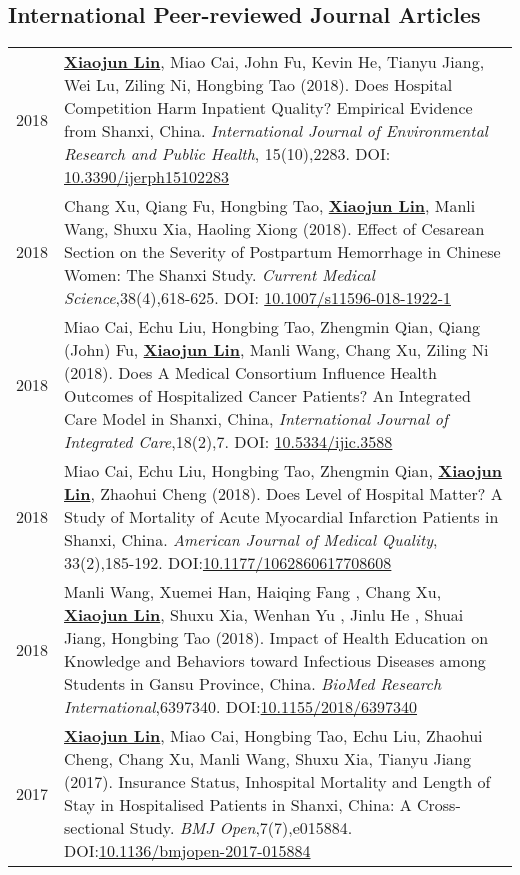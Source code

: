 \documentclass[a4paper,10pt]{article}
\begin{document}
\subsection*{International Peer-reviewed Journal Articles}
\begin{longtable}{r p{13cm}}
2018 & \underline{\textbf{Xiaojun Lin}}, Miao Cai, John Fu, Kevin He, Tianyu Jiang, Wei Lu, Ziling Ni, Hongbing Tao (2018). Does Hospital Competition Harm Inpatient Quality? Empirical Evidence from Shanxi, China. \emph{International Journal of Environmental Research and Public Health}, 15(10),2283. DOI: \href{https://doi.org/10.3390/ijerph15102283}{10.3390/ijerph15102283}\\
2018 & Chang Xu, Qiang Fu, Hongbing Tao, \underline{\textbf{Xiaojun Lin}}, Manli Wang, Shuxu Xia, Haoling Xiong (2018). Effect of Cesarean Section on the Severity of Postpartum Hemorrhage in Chinese Women: The Shanxi Study. \emph{Current Medical Science},38(4),618-625. DOI: \href{https://doi.org/10.1007/s11596-018-1922-1}{10.1007/s11596-018-1922-1}\\
2018 & Miao Cai, Echu Liu, Hongbing Tao, Zhengmin Qian, Qiang (John) Fu, \underline{\textbf{Xiaojun Lin}}, Manli Wang, Chang Xu, Ziling Ni (2018). Does A Medical Consortium Influence Health Outcomes of Hospitalized Cancer Patients? An Integrated Care Model in Shanxi, China, \emph{International Journal of Integrated Care},18(2),7. DOI: \href{https://doi.org/10.5334/ijic.3588}{10.5334/ijic.3588}\\ 
2018 & Miao Cai, Echu Liu, Hongbing Tao, Zhengmin Qian, \underline{\textbf{Xiaojun Lin}}, Zhaohui Cheng (2018). Does Level of Hospital Matter? A Study of Mortality of Acute Myocardial Infarction Patients in Shanxi, China. \emph{American Journal of Medical Quality}, 33(2),185-192. DOI:\href{https://doi.org/10.1177/1062860617708608}{10.1177/1062860617708608}\\ 
2018 & Manli Wang, Xuemei Han, Haiqing Fang , Chang Xu, \underline{\textbf{Xiaojun Lin}}, Shuxu Xia, Wenhan Yu , Jinlu He , Shuai Jiang, Hongbing Tao (2018). Impact of Health Education on Knowledge and Behaviors toward Infectious Diseases among Students in Gansu Province, China. \emph{BioMed Research International},6397340. DOI:\href{https://doi.org/10.1155/2018/6397340}{10.1155/2018/6397340} \\
2017 &  \underline{\textbf{Xiaojun Lin}}, Miao Cai, Hongbing Tao, Echu Liu, Zhaohui Cheng, Chang Xu, Manli Wang, Shuxu Xia, Tianyu Jiang (2017). Insurance Status, Inhospital Mortality and Length of Stay in Hospitalised Patients in Shanxi, China: A Cross-sectional Study. \emph{BMJ Open},7(7),e015884. DOI:\href{https://doi.org/10.1136/bmjopen-2017-015884}{10.1136/bmjopen-2017-015884}\\

\end{longtable}
\end{document}
